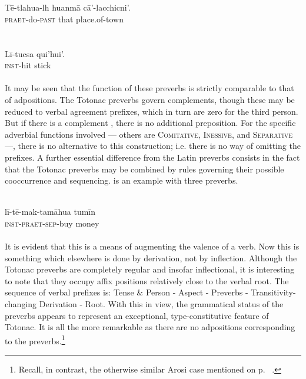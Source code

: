 \ea\label{ex:E81}
\langinfo{\LangToton}{}{}\\
 \ea {}\\
 \gll T\=e-tlahua-lh  huanm\=a  c\=a'-lacchicni'.\\
   \textsc{praet}-do-\textsc{past}  that  place.of-town\\
\\
\ex {}\\
\gll  L\=i-tucsa  qui'hui'.\\
 \textsc{inst}-hit  stick\\
\\
\z
\z
\noindent 
It may be seen that the function of these preverbs is strictly comparable to that of adpositions. The Totonac preverbs govern complements, though these may be reduced to verbal agreement prefixes, which in turn are zero for the third person. But if there is a complement \np, there is no additional preposition. For the specific adverbial functions involved — others are \textsc{Comitative}, \textsc{Inessive}, and \textsc{Separative} —, there is no alternative to this construction; i.e. there is no way of omitting the prefixes.
\newpage
A further essential difference from the Latin preverbs consists in the fact that the Totonac preverbs may be combined by rules governing their possible cooccurrence and sequencing.  is an example with three preverbs.

\ea\label{ex:E82}
 \\
\gll l\=i-t\=e-mak-tam\=ahua  tum\=in\\
\textsc{inst}-\textsc{praet}-\textsc{sep}-buy  money\\
\\
\z
\noindent It is evident that this is a means of augmenting the valence of a verb. Now this is something which elsewhere is done by derivation, not by inflection. Although the Totonac preverbs are completely regular and insofar inflectional, it is interesting to note that they occupy affix positions relatively close to the verbal root. The sequence of verbal prefixes is: Tense \& Person - Aspect - Preverbs - Transitivity-changing Derivation - Root. With this in view, the grammatical status of the preverbs appears to represent an exceptional, type-constitutive feature of Totonac. It is all the more remarkable as there are no adpositions corresponding to the preverbs.\footnote{Recall, in contrast, the otherwise similar Arosi case mentioned on p.~\pageref{page105}\chkfn%
.}

